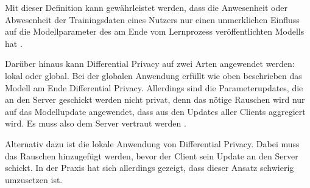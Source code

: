 Mit dieser Definition kann gewährleistet werden, dass die Anwesenheit oder Abwesenheit der Trainingsdaten eines Nutzers nur einen unmerklichen Einfluss auf die Modellparameter des am Ende vom Lernprozess veröffentlichten Modells hat \cite{mcmahan:2018}.

Darüber hinaus kann Differential Privacy auf zwei Arten angewendet werden: lokal oder global. Bei der globalen Anwendung erfüllt wie oben beschrieben das Modell am Ende Differential Privacy. Allerdings sind die Parameterupdates, die an den Server geschickt werden nicht privat, denn das nötige Rauschen wird nur auf das Modellupdate angewendet, dass aus den Updates aller Clients aggregiert wird. Es muss also dem Server vertraut werden \cite[p.44]{kairouz:2021}.

Alternativ dazu ist die lokale Anwendung von Differential Privacy. Dabei muss das Rauschen hinzugefügt werden, bevor der Client sein Update an den Server schickt. In der Praxis hat sich allerdings gezeigt, dass dieser Ansatz schwierig umzusetzen ist\cite[p.54]{kairouz:2021}.